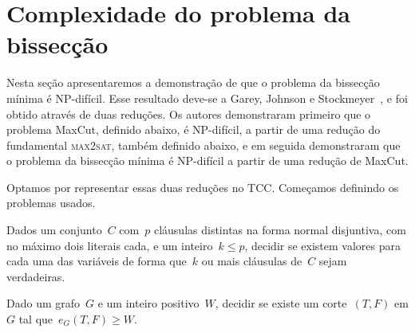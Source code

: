 \section {Complexidade do problema da bissecção}

	Nesta seção apresentaremos a demonstração de que o problema 
	da bissecção mínima é NP-difícil.
	Esse resultado deve-se a Garey, Johnson e Stockmeyer~\cite{GareyJS76},
	e foi obtido através de duas reduções.
	Os autores demonstraram primeiro que o problema MaxCut,
	definido abaixo, é NP-difícil, a partir de uma redução do
	fundamental \textsc {max2sat}, também definido abaixo, e em seguida
	demonstraram que o problema da bissecção mínima é NP-difícil
	a partir de uma redução de MaxCut.

	Optamos por representar essas duas reduções no TCC.
	Começamos definindo os problemas usados.



	\medskip

	\begin{prob}
		Dados um conjunto~$C$ com~$p$ cláusulas distintas na forma 
		normal disjuntiva, com no máximo
		dois literais cada, e um inteiro~$k\le p$,
		decidir se existem valores para cada uma das variáveis de forma
		que~$k$ ou mais cláusulas de~$C$ sejam verdadeiras.

	\end{prob}

	\medskip

	\begin{prob}
		Dado um grafo~${G}$
		e um inteiro positivo~${W}$, decidir se existe um
		corte~$(T,F)$ em $G$ tal 
		que~${e_G(T,F)\ge W}$.
		
	\end{prob}

	

		
